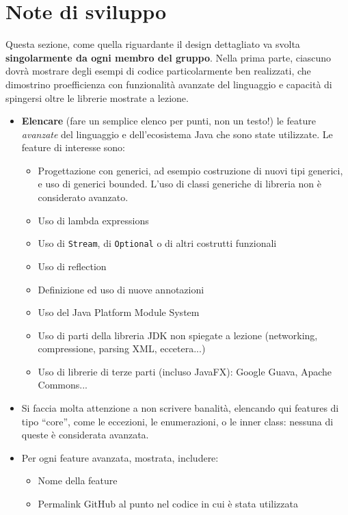 \documentclass[a4paper,12pt]{report}
\begin{document}
\section{Note di sviluppo}

Questa sezione, come quella riguardante il design dettagliato va svolta \textbf{singolarmente da ogni membro del gruppo}.
%
Nella prima parte, ciascuno dovrà mostrare degli esempi di codice particolarmente ben realizzati,
che dimostrino proefficienza con funzionalità avanzate del linguaggio e capacità di spingersi oltre le librerie mostrate a lezione.

\begin{itemize}
	\item \textbf{Elencare} (fare un semplice elenco per punti, non un testo!) le feature \textit{avanzate} del linguaggio e dell'ecosistema Java che sono state
utilizzate. Le feature di interesse sono:
	\begin{itemize}
		\item Progettazione con generici, ad esempio costruzione di nuovi tipi generici, e uso di generici bounded.
		L'uso di classi generiche di libreria non è considerato avanzato.
		\item Uso di lambda expressions
		\item Uso di \texttt{Stream}, di \texttt{Optional} o di altri costrutti funzionali
		\item Uso di reflection
		\item Definizione ed uso di nuove annotazioni
		\item Uso del Java Platform Module System
		\item Uso di parti della libreria JDK non spiegate a lezione (networking, compressione, parsing XML, eccetera...)
		\item Uso di librerie di terze parti (incluso JavaFX): Google Guava, Apache Commons...
	\end{itemize}
	\item Si faccia molta attenzione a non scrivere banalità, elencando qui features di tipo ``core'', come le eccezioni, le enumerazioni, o le inner class: nessuna di queste è considerata avanzata.
	\item Per ogni feature avanzata, mostrata, includere:
	\begin{itemize}
		\item Nome della feature
		\item Permalink GitHub al punto nel codice in cui è stata utilizzata
	\end{itemize}
\end{itemize}
\end{document}
